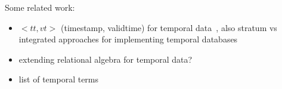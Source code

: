 
%
Some related work:
\begin{itemize}
\item $<tt, vt>$ (timestamp, validtime) for temporal data~\cite{jensen1999temporal},
also stratum vs integrated approaches for implementing temporal databases
\item extending relational algebra for temporal data?~\cite{lorentzos1988extending}
\item list of temporal terms~\cite{dyreson1994consensus}
\end{itemize}
